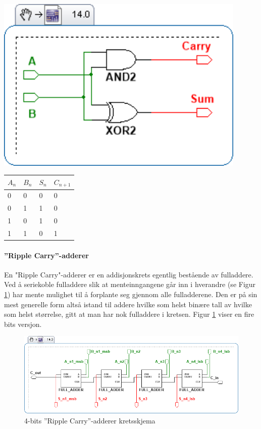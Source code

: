 \documentclass[11pt, a4paper, norwegian]{article}
\begin{document}
{\centering
\begin{minipage}{0.45\textwidth}
  \centering
  \includegraphics[width=0.9\textwidth]{halfadder.png}
  \label{fig_HalfAdd}
\end{minipage}
\begin{minipage}{0.45\textwidth}
  \centering
  \label{tbl_HalfAdd}
  \begin{tabular}{|ll||ll|}
        \hline
        $A_n$ & $B_n$ & $S_n$ & $C_{n+1}$ \\ 	\hline
        0 & 0 & 0 & 0 \\
        0 & 1 & 1 & 0 \\
        1 & 0 & 1 & 0 \\
        1 & 1 & 0 & 1 \\ \hline
  \end{tabular}
\end{minipage}
\endgraf\bigskip
}




\paragraph{''Ripple Carry''-adderer}
En "Ripple Carry"-adderer er en addisjonskrets egentlig bestående av fulladdere. Ved å seriekoble fulladdere slik at menteinngangene går inn i hverandre (se Figur \ref{fig_RiplFull}) har mente mulighet til å forplante seg gjennom alle fulladderene. Den er på sin mest generelle form altså istand til addere hvilke som helst binære tall av hvilke som helst størrelse, gitt at man har nok fulladdere i kretsen. Figur \ref{fig_RiplFull} viser en fire bits versjon. 

\begin{figure}
  \caption{4-bits ''Ripple Carry''-adderer kretsskjema}
  \label{fig_RiplFull}
  \centerline{\includegraphics[width=400pt]{4bit_ripplecarry.png}}
\end{figure}
\end{document}
